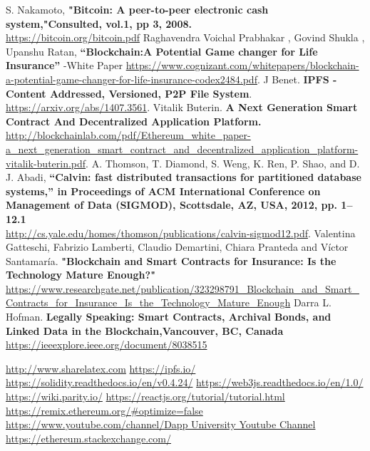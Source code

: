 \renewcommand\bibname{Reference}
\begin{thebibliography}{99}
	\bibitem{}S. Nakamoto, \textbf{"Bitcoin: A peer-to-peer electronic cash system,"Consulted, vol.1, pp 3, 2008.}\\
	\url{https://bitcoin.org/bitcoin.pdf}
	\bibitem{}Raghavendra Voichal Prabhakar , Govind Shukla , Upanshu Ratan, \textbf{“Blockchain:A Potential Game changer for Life Insurance” }-White Paper
	\url{https://www.cognizant.com/whitepapers/blockchain-a-potential-game-changer-for-life-insurance-codex2484.pdf}.
	\bibitem{}J Benet. \textbf{IPFS - Content Addressed, Versioned, P2P File System}.\\
	\url{ https://arxiv.org/abs/1407.3561}.
	\bibitem{}Vitalik Buterin. \textbf{A Next Generation Smart Contract And Decentralized Application Platform.}\\
	\url{http://blockchainlab.com/pdf/Ethereum_white_paper-a_next_generation_smart_contract_and_decentralized_application_platform-vitalik-buterin.pdf}.
	\bibitem{}A. Thomson, T. Diamond, S. Weng, K. Ren, P. Shao, and D. J. Abadi, \textbf{“Calvin: fast distributed transactions for partitioned database systems,” in Proceedings of ACM International Conference on Management of Data (SIGMOD), Scottsdale, AZ, USA, 2012, pp. 1–12.1}\\
	\url{http://cs.yale.edu/homes/thomson/publications/calvin-sigmod12.pdf}.
	\bibitem{}Valentina Gatteschi, Fabrizio Lamberti, Claudio Demartini, Chiara Pranteda and Víctor Santamaría. \textbf{"Blockchain and Smart Contracts for Insurance: Is the Technology Mature Enough?"} \\
	\url{https://www.researchgate.net/publication/323298791_Blockchain_and_Smart_Contracts_for_Insurance_Is_the_Technology_Mature_Enough}
	\bibitem{}Darra L. Hofman. \textbf{Legally Speaking: Smart Contracts, Archival Bonds, and Linked Data in the Blockchain,Vancouver, BC, Canada}\\
	\url{https://ieeexplore.ieee.org/document/8038515}

	\item {}\url{http://www.sharelatex.com}
	\bibitem{} \url{https://ipfs.io/}
	\bibitem{} \url{https://solidity.readthedocs.io/en/v0.4.24/}
	\bibitem{} \url{https://web3js.readthedocs.io/en/1.0/}
	\bibitem{} \url{https://wiki.parity.io/}
	\bibitem{} \url{https://reactjs.org/tutorial/tutorial.html}
	\bibitem{} \url{https://remix.ethereum.org/#optimize=false}
	\bibitem{} \url{https://www.youtube.com/channel/Dapp University Youtube Channel}
	\bibitem{} \url{https://ethereum.stackexchange.com/}
\end{thebibliography}
